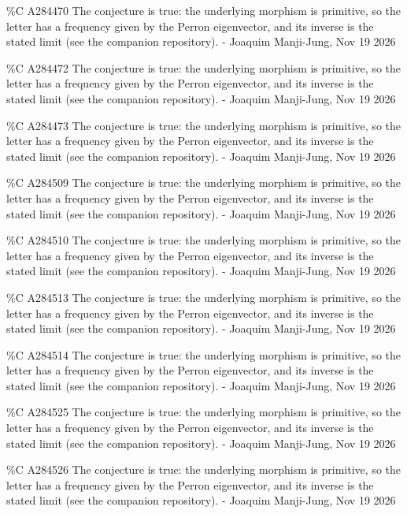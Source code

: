{\%C A284470 The conjecture is true: the underlying morphism is primitive, so the letter has a frequency given by the Perron eigenvector, and its inverse is the stated limit (see the companion repository). - Joaquim Manji-Jung, Nov 19 2026\par
\%C A284472 The conjecture is true: the underlying morphism is primitive, so the letter has a frequency given by the Perron eigenvector, and its inverse is the stated limit (see the companion repository). - Joaquim Manji-Jung, Nov 19 2026\par
\%C A284473 The conjecture is true: the underlying morphism is primitive, so the letter has a frequency given by the Perron eigenvector, and its inverse is the stated limit (see the companion repository). - Joaquim Manji-Jung, Nov 19 2026\par
\%C A284509 The conjecture is true: the underlying morphism is primitive, so the letter has a frequency given by the Perron eigenvector, and its inverse is the stated limit (see the companion repository). - Joaquim Manji-Jung, Nov 19 2026\par
\%C A284510 The conjecture is true: the underlying morphism is primitive, so the letter has a frequency given by the Perron eigenvector, and its inverse is the stated limit (see the companion repository). - Joaquim Manji-Jung, Nov 19 2026\par
\%C A284513 The conjecture is true: the underlying morphism is primitive, so the letter has a frequency given by the Perron eigenvector, and its inverse is the stated limit (see the companion repository). - Joaquim Manji-Jung, Nov 19 2026\par
\%C A284514 The conjecture is true: the underlying morphism is primitive, so the letter has a frequency given by the Perron eigenvector, and its inverse is the stated limit (see the companion repository). - Joaquim Manji-Jung, Nov 19 2026\par
\%C A284525 The conjecture is true: the underlying morphism is primitive, so the letter has a frequency given by the Perron eigenvector, and its inverse is the stated limit (see the companion repository). - Joaquim Manji-Jung, Nov 19 2026\par
\%C A284526 The conjecture is true: the underlying morphism is primitive, so the letter has a frequency given by the Perron eigenvector, and its inverse is the stated limit (see the companion repository). - Joaquim Manji-Jung, Nov 19 2026\par
}
